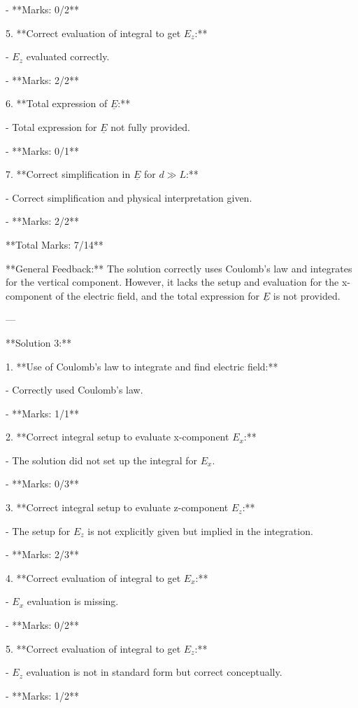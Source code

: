 \documentclass[a4paper,11pt]{article}
\begin{document}
   - **Marks: 0/2**

5. **Correct evaluation of integral to get \(E_z\):**

   - \(E_z\) evaluated correctly.
   
   - **Marks: 2/2**

6. **Total expression of \(\underline{E}\):**

   - Total expression for \( \underline{E} \) not fully provided.
   
   - **Marks: 0/1**

7. **Correct simplification in \(\underline{E}\) for \( d \gg L \):**

   - Correct simplification and physical interpretation given.
   
   - **Marks: 2/2**

   **Total Marks: 7/14**

**General Feedback:** The solution correctly uses Coulomb's law and integrates for the vertical component. However, it lacks the setup and evaluation for the x-component of the electric field, and the total expression for \(\underline{E}\) is not provided.

---

**Solution 3:**

1. **Use of Coulomb's law to integrate and find electric field:**

   - Correctly used Coulomb's law.
   
   - **Marks: 1/1**

2. **Correct integral setup to evaluate x-component \(E_x\):**

   - The solution did not set up the integral for \(E_x\).
   
   - **Marks: 0/3**

3. **Correct integral setup to evaluate z-component \(E_z\):**

   - The setup for \(E_z\) is not explicitly given but implied in the integration.
   
   - **Marks: 2/3**

4. **Correct evaluation of integral to get \(E_x\):**

   - \(E_x\) evaluation is missing.
   
   - **Marks: 0/2**

5. **Correct evaluation of integral to get \(E_z\):**

   - \(E_z\) evaluation is not in standard form but correct conceptually.
   
   - **Marks: 1/2**
\end{document}

